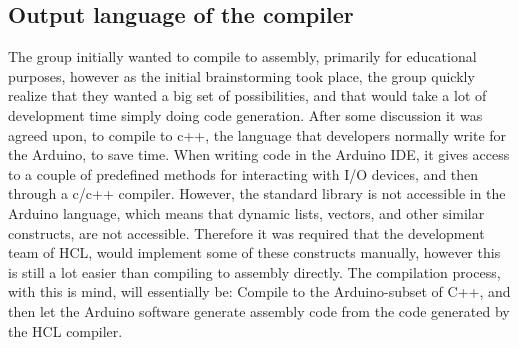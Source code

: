 \subsection{Output language of the compiler}
The group initially wanted to compile to assembly, primarily for educational purposes, however as the initial brainstorming took place, the group quickly realize that they wanted a big set of possibilities, and that would take a lot of development time simply doing code generation. 
After some discussion it was agreed upon, to compile to c++, the language that developers normally write for the Arduino, to save time.
When writing code in the Arduino IDE, it gives access to a couple of predefined methods for interacting with I/O devices, and then through a c/c++ compiler. \cite{ArFAQ}
However, the standard library is not accessible in the Arduino language, which means that dynamic lists, vectors, and other similar constructs, are not accessible.
Therefore it was required that the development team of HCL, would implement some of these constructs manually, however this is still a lot easier than compiling to assembly directly. 
The compilation process, with this is mind, will essentially be: Compile to the Arduino-subset of C++, and then let the Arduino software generate assembly code from the code generated by the HCL compiler.

